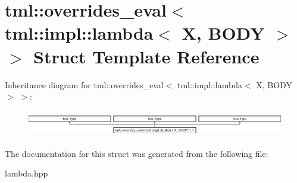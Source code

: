 \hypertarget{structtml_1_1overrides__eval_3_01tml_1_1impl_1_1lambda_3_01X_00_01BODY_01_4_01_4}{\section{tml\+:\+:overrides\+\_\+eval$<$ tml\+:\+:impl\+:\+:lambda$<$ X, B\+O\+D\+Y $>$ $>$ Struct Template Reference}
\label{structtml_1_1overrides__eval_3_01tml_1_1impl_1_1lambda_3_01X_00_01BODY_01_4_01_4}
}
Inheritance diagram for tml\+:\+:overrides\+\_\+eval$<$ tml\+:\+:impl\+:\+:lambda$<$ X, B\+O\+D\+Y $>$ $>$\+:\begin{figure}[H]
\begin{center}
\leavevmode
\includegraphics[height=1.177708cm]{structtml_1_1overrides__eval_3_01tml_1_1impl_1_1lambda_3_01X_00_01BODY_01_4_01_4}
\end{center}
\end{figure}


The documentation for this struct was generated from the following file\+:\begin{DoxyCompactItemize}
\item 
lambda.\+hpp\end{DoxyCompactItemize}
